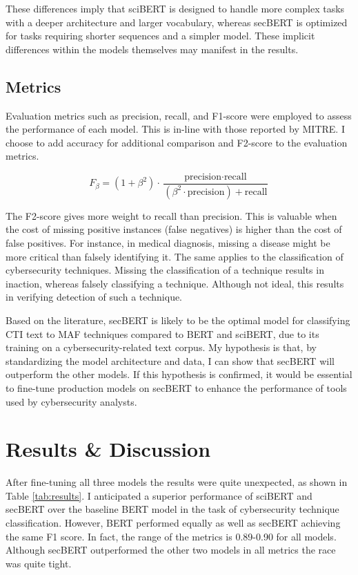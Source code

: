 \documentclass[11pt]{article}
\begin{document}
These differences imply that sciBERT is designed to handle more complex tasks with a deeper architecture and larger vocabulary, whereas secBERT is optimized for tasks requiring shorter sequences and a simpler model. These implicit differences within the models themselves may manifest in the results. 

\subsection{Metrics}

Evaluation metrics such as precision, recall, and F1-score were employed to assess the performance of each model. This is in-line with those reported by MITRE. I choose to add accuracy for additional comparison and F2-score to the evaluation metrics. 

\begin{equation}
    F_{\beta} = (1 + \beta^2) \cdot \frac{\text{precision} \cdot \text{recall}}{(\beta^2 \cdot \text{precision}) + \text{recall}}
\end{equation}

The F2-score gives more weight to recall than precision. This is valuable when the cost of missing positive instances (false negatives) is higher than the cost of false positives. For instance, in medical diagnosis, missing a disease might be more critical than falsely identifying it. The same applies to the classification of cybersecurity techniques. Missing the classification of a technique results in inaction, whereas falsely classifying a technique. Although not ideal, this results in verifying detection of such a technique.  

Based on the literature, secBERT is likely to be the optimal model for classifying CTI text to MAF techniques compared to BERT and sciBERT, due to its training on a cybersecurity-related text corpus. My hypothesis is that, by standardizing the model architecture and data, I can show that secBERT will outperform the other models. If this hypothesis is confirmed, it would be essential to fine-tune production models on secBERT to enhance the performance of tools used by cybersecurity analysts. 

\section{Results \& Discussion}

After fine-tuning all three models the results were quite unexpected, as shown in Table \ref{tab:results}. I anticipated a superior performance of sciBERT and secBERT over the baseline BERT model in the task of cybersecurity technique classification. However, BERT performed equally as well as secBERT achieving the same F1 score. In fact, the range of the metrics is 0.89-0.90 for all models. Although secBERT outperformed the other two models in all metrics the race was quite tight. 
\end{document}
